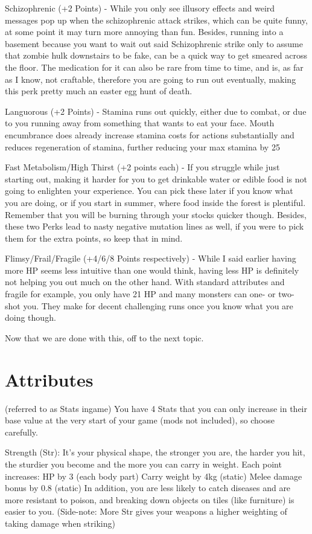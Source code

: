 \documentclass[11pt]{report}
\begin{document}
Schizophrenic (+2 Points) - While you only see illusory effects and weird messages pop up when the schizophrenic attack strikes, which can be quite funny, at some point it may turn more annoying than fun. Besides, running into a basement because you want to wait out said Schizophrenic strike only to assume that zombie hulk downstairs to be fake, can be a quick way to get smeared across the floor. The medication for it can also be rare from time to time, and is, as far as I know, not craftable, therefore you are going to run out eventually, making this perk pretty much an easter egg hunt of death.

Languorous (+2 Points) - Stamina runs out quickly, either due to combat, or due to you running away from something that wants to eat your face. Mouth encumbrance does already increase stamina costs for actions substantially and reduces regeneration of stamina, further reducing your max stamina by 25%

Fast Metabolism/High Thirst (+2 points each) - If you struggle while just starting out, making it harder for you to get drinkable water or edible food is not going to enlighten your experience. You can pick these later if you know what you are doing, or if you start in summer, where food inside the forest is plentiful. Remember that you will be burning through your stocks quicker though.
Besides, these two Perks lead to nasty negative mutation lines as well, if you were to pick them for the extra points, so keep that in mind.

Flimsy/Frail/Fragile (+4/6/8 Points respectively) - While I said earlier having more HP seems less intuitive than one would think, having less HP is definitely not helping you out much on the other hand. With standard attributes and fragile for example, you only have 21 HP and many monsters can one- or two-shot you. They make for decent challenging runs once you know what you are doing though.

Now that we are done with this, off to the next topic.

\section{Attributes}

(referred to as Stats ingame)
You have 4 Stats that you can only increase in their base value at the very start of your game (mods not included), so choose carefully.

Strength (Str): It's your physical shape, the stronger you are, the harder you hit, the sturdier you become and the more you can carry in weight. Each point increases:
HP by 3 (each body part)
Carry weight by 4kg (static)
Melee damage bonus by 0.8 (static)
In addition, you are less likely to catch diseases and are more resistant to poison, and breaking down objects on tiles (like furniture) is easier to you.
(Side-note: More Str gives your weapons a higher weighting of taking damage when striking)
\end{document}
